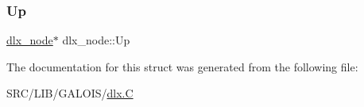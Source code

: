 \mbox{\label{structdlx__node_a9093c5ee407cbfc878291ee64b72f530}} 
\subsubsection{\texorpdfstring{Up}{Up}}
{\footnotesize\ttfamily \mbox{\hyperlink{structdlx__node}{dlx\+\_\+node}}$\ast$ dlx\+\_\+node\+::\+Up}



The documentation for this struct was generated from the following file\+:\begin{DoxyCompactItemize}
\item 
S\+R\+C/\+L\+I\+B/\+G\+A\+L\+O\+I\+S/\mbox{\hyperlink{_l_i_b_2_g_a_l_o_i_s_2dlx_8_c}{dlx.\+C}}\end{DoxyCompactItemize}
